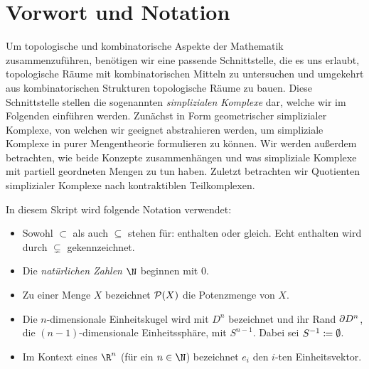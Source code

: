 
\chapter{Vorwort und Notation}
Um topologische und kombinatorische Aspekte der Mathematik zusammenzuführen,
benötigen wir eine passende Schnittstelle, die es uns erlaubt, topologische
Räume mit kombinatorischen Mitteln zu untersuchen und umgekehrt aus
kombinatorischen Strukturen topologische Räume zu bauen. Diese Schnittstelle
stellen die sogenannten \emph{simplizialen Komplexe} dar, welche wir im
Folgenden einführen werden. Zunächst in Form geometrischer simplizialer
Komplexe, von welchen wir geeignet abstrahieren werden, um simpliziale Komplexe
in purer Mengentheorie formulieren zu können. Wir werden außerdem betrachten,
wie beide Konzepte zusammenhängen und was simpliziale Komplexe mit partiell
geordneten Mengen zu tun haben. Zuletzt betrachten wir Quotienten simplizialer
Komplexe nach kontraktiblen Teilkomplexen.


\bigskip
In diesem Skript wird folgende Notation verwendet:
\begin{itemize}
    \item
        Sowohl $\subset$ als auch $\subseteq$ stehen für: enthalten oder gleich.
        Echt enthalten wird durch $\subsetneq$ gekennzeichnet.
    
    \item
        Die \emph{natürlichen Zahlen $\N$} beginnen mit $0$.
        
    \item
        Zu einer Menge $X$ bezeichnet $\operatorname{\mathcal{P}}(X)$ die Potenzmenge von $X$.

    \item %
        Die $n$-dimensionale Einheitskugel wird mit $D^n$ bezeichnet und
        ihr Rand $\partial D^n$, 
        die $(n{-}1)$-dimensionale Einheitssphäre, mit $S^{n-1}$.
        Dabei sei $S^{-1} \coloneqq \emptyset$.
        
    \item
        Im Kontext eines $\R^n$ (für ein $n\in\N$) bezeichnet $e_i$ den $i$-ten
        Einheitsvektor.
\end{itemize}










